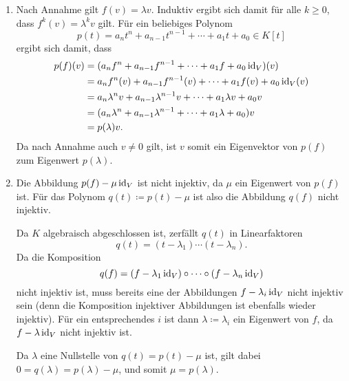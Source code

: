 \documentclass[a4paper, 10pt]{scrartcl}
\begin{document}
\begin{solution}
  \begin{enumerate}
    \item
      Nach Annahme gilt $f(v) = \lambda v$.
      Induktiv ergibt sich damit für alle $k \geq 0$, dass $f^k(v) = \lambda^k v$ gilt.
      Für ein beliebiges Polynom
      \[
          p(t)
        = a_n t^n + a_{n-1} t^{n-1} + \dotsb + a_1 t + a_0 \in K[t]
      \]
      ergibt sich damit, dass
      \begin{align*}
            p(f)(v)
        &=  (a_n f^n + a_{n-1} f^{n-1} + \dotsb + a_1 f + a_0 \operatorname{id}_V)(v)                 \\
        &=  a_n f^n(v) + a_{n-1} f^{n-1}(v) + \dotsb + a_1 f(v) + a_0 \operatorname{id}_V(v)          \\
        &=  a_n \lambda^n v + a_{n-1} \lambda^{n-1} v + \dotsb + a_1 \lambda v + a_0 v  \\
        &=  (a_n \lambda^n + a_{n-1} \lambda^{n-1} + \dotsb + a_1 \lambda + a_0) v      \\
        &=  p(\lambda) v.
      \end{align*}
      Da nach Annahme auch $v \neq 0$ gilt, ist $v$ somit ein Eigenvektor von $p(f)$ zum Eigenwert $p(\lambda)$.
      
    \item
      Die Abbildung $p(f) - \mu \operatorname{id}_V$ ist nicht injektiv, da $\mu$ ein Eigenwert von $p(f)$ ist.
      Für das Polynom $q(t) \coloneqq p(t) - \mu$ ist also die Abbildung $q(f)$ nicht injektiv.
      
      Da $K$ algebraisch abgeschlossen ist, zerfällt $q(t)$ in Linearfaktoren
      \[
        q(t) = (t - \lambda_1) \dotsm (t - \lambda_n).
      \]
      Da die Komposition
      \[
          q(f)
        = (f - \lambda_1 \operatorname{id}_V) \circ \dotsb \circ (f - \lambda_n \operatorname{id}_V)
      \]
      nicht injektiv ist, muss bereits eine der Abbildungen $f - \lambda_i \operatorname{id}_V$ nicht injektiv sein (denn die Komposition injektiver Abbildungen ist ebenfalls wieder injektiv).
      Für ein entsprechendes $i$ ist dann $\lambda \coloneqq \lambda_i$ ein Eigenwert von $f$, da $f - \lambda \operatorname{id}_V$ nicht injektiv ist.
      
      Da $\lambda$ eine Nullstelle von $q(t) = p(t) - \mu$ ist, gilt dabei $0 = q(\lambda) = p(\lambda) - \mu$, und somit $\mu = p(\lambda)$.
  \end{enumerate}
\end{solution}
\end{document}
